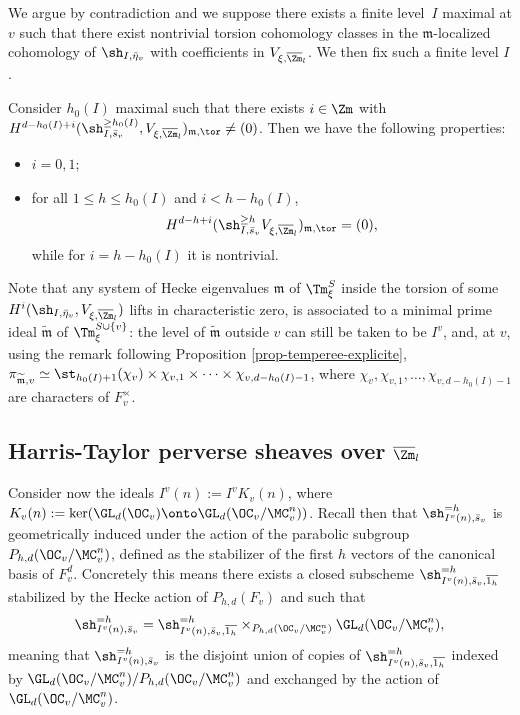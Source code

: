 \begin{mainassumption}
We argue by contradiction and we suppose there exists a finite level~$I$ maximal at $v$
such that there
exist nontrivial torsion cohomology classes in the $\mathfrak m$-localized cohomology of
$\sh_{I,\bar \eta_v}$ with coefficients in $V_{\xi,\overline \Zm_l}$.
We then fix such a finite level $I$.
\end{mainassumption}

\begin{prop} \label{prop-h0I}
Consider $h_0(I)$ maximal such that there exists $i \in \Zm$ with
$H^{d-h_0(I)+i}(\sh_{I,\bar s_v}^{\geq h_0(I)}, V_{\xi,\overline \Zm_l})_{\mathfrak m,\tor}
\neq (0)$. Then we have the following properties:
\begin{itemize}
\item $i=0,1$;

\item for all $1 \leq h \leq h_0(I)$ and $i<h-h_0(I)$,
\[
H^{d-h+i}(\sh_{I,\bar s_v}^{\geq h} V_{\xi,\overline \Zm_l})_{\mathfrak m,\tor} =(0),
\]
while for $i=h-h_0(I)$ it is nontrivial.
\end{itemize}
\end{prop}

\begin{remark}
Note that any system of Hecke eigenvalues
$\mathfrak m$ of $\Tm^S_\xi$ inside the torsion of some
$H^i(\sh_{I,\bar \eta_v},V_{\xi,\overline \Zm_l})$ lifts in characteristic zero, \ie is associated to a minimal prime ideal $\widetilde{\mathfrak m}$ of
$\Tm^{S \cup \{v\}}_{\xi}$: the level of $\widetilde{\mathfrak m}$ outside $v$ can still
be taken to be $I^v$, and, at $v$, using the remark following Proposition
\ref{prop-temperee-explicite}, $\pi_{\widetilde{\mathfrak m},v} \simeq
\st_{h_0(I)+1}(\chi_v) \times \chi_{v,1} \times \cdots \times \chi_{v,d-h_0(I)-1}$,
where $\chi_v, \chi_{v,1},\dots, \chi_{v,d-h_0(I)-1}$ are characters of $F_v^\times$.
\end{remark}

\subsection{Harris-Taylor perverse sheaves over $\overline \Zm_l$}
\label{para-HT}

Consider now the ideals $I^v(n):=I^vK_v(n)$, where
$K_v(n):=\ker(\GL_d(\OC_v) \onto \GL_d(\OC_v/\MC_v^n))$.
Recall then that $\sh_{I^v(n),\bar s_v}^{=h}$ is geometrically induced
under the action of the parabolic subgroup $P_{h,d}(\OC_v/\MC_v^n)$, defined as the
stabilizer of the first $h$ vectors of the canonical basis of $F_v^d$. Concretely this means there
exists a closed subscheme $\sh_{I^v(n),\bar s_v,\overline{1_{h}}}^{=h}$ stabilized by the Hecke
action of $P_{h,d}(F_v)$ and such that
\[
\sh_{I^v(n),\bar s_v}^{=h} = \sh_{I^v(n),\bar s_v,\overline{1_{h}}}^{=h}
\times_{P_{h,d}(\OC_v/\MC_v^n)} \GL_d(\OC_v/\MC_v^n),
\]
meaning that $\sh_{I^v(n),\bar s_v}^{=h} $ is the disjoint union of copies of
$\sh_{I^v(n),\bar s_v,\overline{1_{h}}}^{=h}$ indexed by
$\GL_d(\OC_v/\MC_v^n)/P_{h,d}(\OC_v/\MC_v^n)$ and
exchanged by the action of
$\GL_d(\OC_v/\MC_v^n)$.

